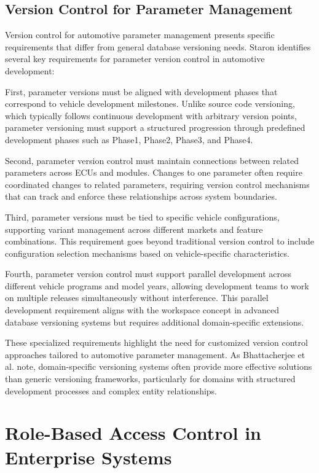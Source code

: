 \subsection{Version Control for Parameter Management}
\label{subsec:version-control-parameter-management}

Version control for automotive parameter management presents specific requirements that differ from general database versioning needs. Staron \cite{staron2021automotive} identifies several key requirements for parameter version control in automotive development:

First, parameter versions must be aligned with development phases that correspond to vehicle development milestones. Unlike source code versioning, which typically follows continuous development with arbitrary version points, parameter versioning must support a structured progression through predefined development phases such as Phase1, Phase2, Phase3, and Phase4.

Second, parameter version control must maintain connections between related parameters across ECUs and modules. Changes to one parameter often require coordinated changes to related parameters, requiring version control mechanisms that can track and enforce these relationships across system boundaries.

Third, parameter versions must be tied to specific vehicle configurations, supporting variant management across different markets and feature combinations. This requirement goes beyond traditional version control to include configuration selection mechanisms based on vehicle-specific characteristics.

Fourth, parameter version control must support parallel development across different vehicle programs and model years, allowing development teams to work on multiple releases simultaneously without interference. This parallel development requirement aligns with the workspace concept in advanced database versioning systems but requires additional domain-specific extensions.

These specialized requirements highlight the need for customized version control approaches tailored to automotive parameter management. As Bhattacherjee et al. \cite{bhattacherjee2015principles} note, domain-specific versioning systems often provide more effective solutions than generic versioning frameworks, particularly for domains with structured development processes and complex entity relationships.

\section{Role-Based Access Control in Enterprise Systems}
\label{sec:role-based-access-control}

